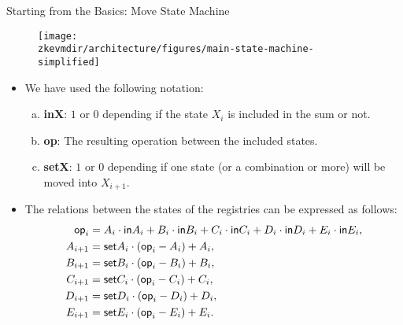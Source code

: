 \begin{frame}[allowframebreaks]{Starting from the Basics: Move State Machine}
\vspace{-0.3cm}
\begin{figure}
	\texttt{[image: \\zkevmdir/architecture/figures/main-state-machine-simplified]}
\end{figure}

\begin{itemize}
\item We have used the following notation:
\begin{enumerate}[a)]
\item \textbf{inX}: $1$ or $0$ depending if the state $X_i$ is included in the sum or not.

\item \textbf{op}: The resulting operation between the included states.

\item \textbf{setX}: $1$ or $0$ depending if one state (or a combination or more) will be moved into $X_{i+1}$.
\end{enumerate}
 
\item The relations between the states of the registries can be expressed as follows:
\begin{align*}
\mathsf{op}_i &= A_i \cdot \mathsf{in} A_i + B_i \cdot \mathsf{in} B_i + C_i \cdot \mathsf{in} C_i + D_i \cdot \mathsf{in} D_i + E_i \cdot \mathsf{in} E_i, \\
A_{i+1} &= \mathsf{set} A_i \cdot (\mathsf{op}_i - A_i) + A_i, \\
B_{i+1} &= \mathsf{set} B_i \cdot (\mathsf{op}_i - B_i) + B_i, \\
C_{i+1} &= \mathsf{set} C_i \cdot (\mathsf{op}_i - C_i) + C_i, \\
D_{i+1} &= \mathsf{set} D_i \cdot (\mathsf{op}_i - D_i) + D_i, \\
E_{i+1} &= \mathsf{set} E_i \cdot (\mathsf{op}_i - E_i) + E_i.
\end{align*}
\end{itemize}
\end{frame}




